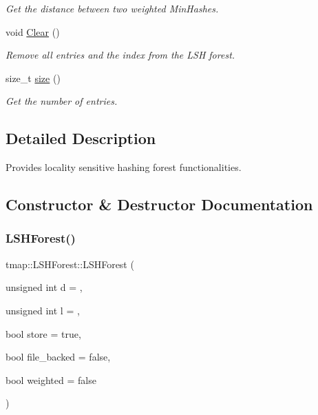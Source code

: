 \begin{DoxyCompactItemize}
\begin{DoxyCompactList}\small\item\em Get the distance between two weighted Min\+Hashes. \end{DoxyCompactList}\item 
\mbox{\label{classtmap_1_1LSHForest_a9ee2595fb0f85d917989234ab4aaee8d}} 
void \hyperlink{classtmap_1_1LSHForest_a9ee2595fb0f85d917989234ab4aaee8d}{Clear} ()
\begin{DoxyCompactList}\small\item\em Remove all entries and the index from the L\+SH forest. \end{DoxyCompactList}\item 
size\+\_\+t \hyperlink{classtmap_1_1LSHForest_a8ba5c1f500e915c6717c64ac24744874}{size} ()
\begin{DoxyCompactList}\small\item\em Get the number of entries. \end{DoxyCompactList}\end{DoxyCompactItemize}


\subsection{Detailed Description}
Provides locality sensitive hashing forest functionalities. 

\subsection{Constructor \& Destructor Documentation}
\mbox{\label{classtmap_1_1LSHForest_a90a9f6e40e63f90838c7ece0e0e3ec25}} 
\subsubsection{\texorpdfstring{L\+S\+H\+Forest()}{LSHForest()}}
{\footnotesize\ttfamily tmap\+::\+L\+S\+H\+Forest\+::\+L\+S\+H\+Forest (\begin{DoxyParamCaption}\item[{unsigned int}]{d = {},  }\item[{unsigned int}]{l = {},  }\item[{bool}]{store = {\ttfamily true},  }\item[{bool}]{file\+\_\+backed = {\ttfamily false},  }\item[{bool}]{weighted = {\ttfamily false} }\end{DoxyParamCaption})}



